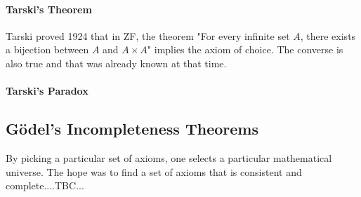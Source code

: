 


\paragraph{Tarski's Theorem}
Tarski proved 1924 that in ZF, the theorem "For every infinite set $A$, there exists a bijection between $A$ and $A \times A$" implies the axiom of choice. The converse is also true and that was already known at that time. 






\paragraph{Tarski's Paradox}



\subsection{Gödel's Incompleteness Theorems}
By picking a particular set of axioms, one selects a particular mathematical universe. The hope was to find a set of axioms that is consistent and complete....TBC...



